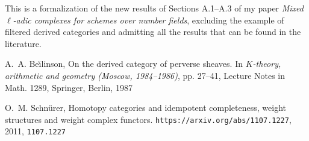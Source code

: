 %

This is a formalization of the new results of Sections A.1--A.3 of my paper 
\emph{Mixed $\ell$-adic complexes for schemes over number fields}, excluding
the example of filtered derived categories and admitting
all the results that can be found in the literature.





\def\cprime{$'$}
\begin{thebibliography}{10}
\providecommand{\url}[1]{\texttt{#1}}
\providecommand{\urlprefix}{URL }
\providecommand{\eprint}[2][]{\url{#2}}

A.~A. Be{\u\i}linson, On the derived category of perverse sheaves. In
  \emph{{$K$}-theory, arithmetic and geometry ({M}oscow, 1984--1986)}, pp.
  27--41, Lecture Notes in Math. 1289, Springer, Berlin, 1987 

O.~M. Schnürer, Homotopy categories and idempotent completeness, weight
  structures and weight complex functors.
  \url{https://arxiv.org/abs/1107.1227}, 2011, \eprint{1107.1227}

\end{thebibliography}